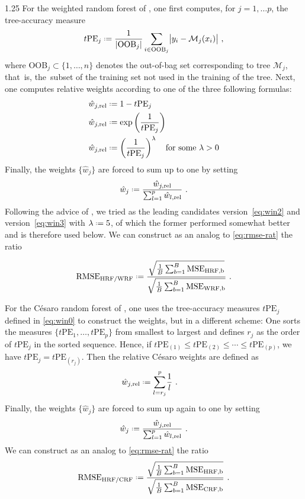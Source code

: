 \documentclass[12pt]{article}
\newcommand*{\defeq}{\mathrel{\vcenter{\baselineskip0.5ex\lineskiplimit0pt\hbox{\scriptsize.}\hbox{\scriptsize.}}}=}
\newcommand{\M}{\mathcal M}
\numberwithin{equation}{section}
\theoremstyle{plain}
\begin{document}
\begin{spacing}{1.25}
For the weighted random forest of \cite{winham:2013}, one first
computes, for $j = 1, \ldots p$,
the tree-accuracy measure
\begin{align}
t\mbox{PE}_j \label{eq:win0} \defeq \frac{1}{|\text{OOB}_j|}
\sum_{i \in \text{OOB}_j} \bigl |y_i - \M_j(x_i)\bigr |~,
\end{align}
where OOB$_j \subset \{1, \ldots, n\}$ denotes the out-of-bag set
corresponding to tree $\M_j$, that~is, the~subset of the
training set not used in the training of the tree.
Next, one computes
relative weights according to one of the three following formulas:
\begin{align}
\hat w_{j, \text{rel}} & \defeq 1 - t\mbox{PE}_j \label{eq:win1} \\
  \hat w_{j, \text{rel}} & \defeq \exp \left (\frac{1}{t\mbox{PE}_j} \right )
              \label{eq:win2}  \\
\hat w_{j, \text{rel}} & \defeq \left (\frac{1}{t\mbox{PE}_j} \right )^\lambda
            \quad \mbox{for some } \lambda > 0 \label{eq:win3}            
\end{align}
Finally, the weights $\{\hat w_j\}$ are forced to sum up to one by setting
$$
\hat w_j \defeq \frac{\hat w_{j, \text{rel}}}{\sum_{l=1}^p \hat w_{l, \text{rel}}}~.
$$
Following the advice of \cite{winham:2013}, we tried as the
leading candidates version~\eqref{eq:win2} and 
version~\eqref{eq:win3} with $\lambda \defeq 5$, of which the former performed
somewhat better and is therefore used below.
We can construct as an analog to \eqref{eq:rmse-rat} the ratio

\begin{equation}\label{eq:rmse-rat-win}
\text{RMSE}_{\text{HRF}/\text{WRF}} \defeq 
  \frac{
  \sqrt{\frac{1}{B} \sum_{b=1}^B  \text{MSE}_{\text{HRF,b}}}}
  {\sqrt{\frac{1}{B} \sum_{b=1}^B  \text{MSE}_{\text{WRF,b}}}}~.
\end{equation}

For the Césaro random forest of \citet{pham:2020}, one uses
the tree-accuracy measures $t\mbox{PE}_j$ defined in \eqref{eq:win0}
to construct the weights, but in a different scheme:
One sorts the
measures $\{t\mbox{PE}_1, \ldots, t\mbox{PE}_p\}$ from smallest to largest
and defines $r_j$ as the order of $t\mbox{PE}_j$ in the sorted
sequence. Hence, if
$
t\mbox{PE}_{(1)} \le  t\mbox{PE}_{(2)} \le \cdots \le t\mbox{PE}_{(p)}
$, we have $t\mbox{PE}_j =  t\mbox{PE}_{(r_j)}$.
Then the relative Césaro weights are defined as
\begin{align}
\hat w_{j, \text{rel}} & \defeq {\sum_{l=r_j}^p }\frac{1}{l} \label{eq:cesaro1}~.           
\end{align}
Finally, the weights $\{\hat w_j\}$ are forced to sum up again to one 
by setting
$$
\hat w_j \defeq \frac{\hat w_{j, \text{rel}}}{\sum_{l=1}^p \hat w_{l, \text{rel}}}~.
$$
We can construct as an analog to \eqref{eq:rmse-rat} the ratio
\begin{equation}\label{eq:rmse-rat-cesaro}
\text{RMSE}_{\text{HRF}/\text{CRF}} \defeq 
  \frac{
  \sqrt{\frac{1}{B} \sum_{b=1}^B  \text{MSE}_{\text{HRF,b}}}}
  {\sqrt{\frac{1}{B} \sum_{b=1}^B  \text{MSE}_{\text{CRF,b}}}}~.
\end{equation}


\end{spacing}
\end{document}
